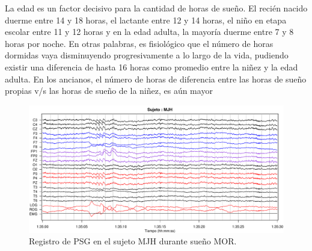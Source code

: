 La edad es un factor decisivo para la cantidad de horas de sueño. El recién nacido duerme entre 14 y 18 horas, el lactante entre 12 y 14 horas, el niño en etapa escolar entre 11 y 12 horas y en la edad adulta, la mayoría duerme entre 7 y 8 horas por noche. En otras palabras, es fisiológico que el número de horas dormidas vaya disminuyendo progresivamente a lo largo de la vida, pudiendo existir una diferencia de hasta 16 horas como promedio entre la niñez y la edad adulta. En los ancianos, el número de horas de diferencia entre las horas de sueño propias v/s las horas de sueño de la niñez, es aún mayor \cite{Contreras13}

\begin{figure}
\centering
\includegraphics[width=\linewidth]
{./img_ejemplos/MJH_190_PDG_lucirse_PSG.pdf}
\caption{Registro de PSG en el sujeto MJH durante sueño MOR. 
}
\label{ejemplos_mor}
\end{figure}

%

